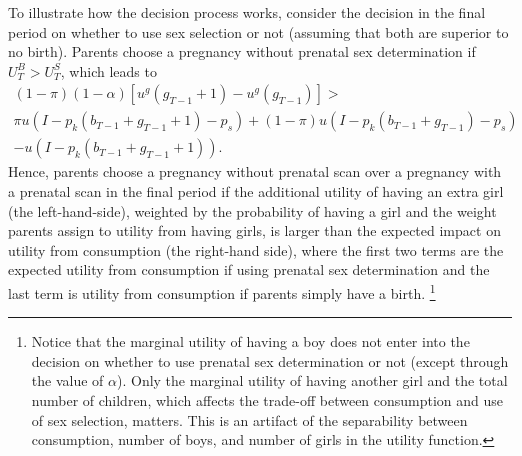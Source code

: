 \documentclass[12pt,letterpaper]{article}
\begin{document}
To illustrate how the decision process works, consider
the decision in the final period on whether to use sex selection or not
(assuming that both are superior to no birth).
Parents choose a pregnancy without prenatal sex determination
if $U_T^B > U_T^S$, which leads to
\begin{multline} \label{eq:last_simple}
(1-\pi)(1-\alpha) [ u^g(g_{T-1}+1) - u^g(g_{T-1}) ]
> \\
\pi u(I - p_k(b_{T-1} + g_{T-1} + 1) - p_s) 
+ (1-\pi) u(I - p_k(b_{T-1} + g_{T-1}) - p_s) \\
- u(I - p_k(b_{T-1} + g_{T-1}+1)).
\end{multline}
Hence, parents choose a pregnancy without prenatal scan over
a pregnancy with a prenatal scan in the final period if
the additional utility of having an extra girl (the left-hand-side),
weighted by the probability of having a girl and the weight parents
assign to utility from having girls, is larger than the expected impact on
utility from consumption (the right-hand side), where
the first two terms are the expected utility from consumption if 
using prenatal sex determination and the last term is utility from
consumption if parents simply have a birth.%
\footnote{
Notice that the marginal utility of having a boy does not enter
into the decision on whether to use prenatal sex determination or not
(except through the value of $\alpha$).
Only the marginal utility of having another girl
and the total number of children, which affects the trade-off between
consumption and use of sex selection, matters.
This is an artifact of the separability between consumption, number of
boys, and number of girls in the utility function.
}
\end{document}
